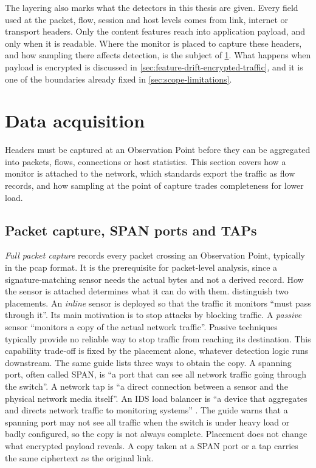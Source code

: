 The layering also marks what the detectors in this thesis are given. Every
field used at the packet, flow, session and host levels comes from link,
internet or transport headers. Only the content features reach into
application payload, and only when it is readable. Where the monitor is
placed to capture these headers, and how sampling there affects detection,
is the subject of \cref{sec:data-acquisition}. What happens when payload is
encrypted is discussed in \cref{sec:feature-drift-encrypted-traffic}, and it
is one of the boundaries already fixed in \cref{sec:scope-limitations}.

\section{Data acquisition}
\label{sec:data-acquisition}

Headers must be captured at an Observation Point before they can be
aggregated into packets, flows, connections or host statistics. This section
covers how a monitor is attached to the network, which standards export the
traffic as flow records, and how sampling at the point of capture trades
completeness for lower load.

\subsection{Packet capture, SPAN ports and TAPs}
\label{sec:packet-capture-mechanisms}

\emph{Full packet capture} records every packet crossing an Observation
Point, typically in the pcap format. It is the prerequisite for packet-level
analysis, since a signature-matching sensor needs the actual bytes and not a
derived record. How the sensor is attached determines what it can do with
them. \citet{scarfone2007nist80094} distinguish two placements. An
\emph{inline} sensor is deployed so that the traffic it monitors ``must pass
through it''. Its main motivation is to stop attacks by blocking traffic. A
\emph{passive} sensor ``monitors a copy of the actual network traffic''.
Passive techniques typically provide no reliable way to stop traffic from
reaching its destination. This capability trade-off is fixed by the
placement alone, whatever detection logic runs downstream. The same guide
lists three ways to obtain the copy. A spanning port, often called SPAN, is
``a port that can see all network traffic going through the switch''. A
network tap is ``a direct connection between a sensor and the physical
network media itself''. An IDS load balancer is ``a device that aggregates
and directs network traffic to monitoring systems''
\citep{scarfone2007nist80094}. The guide warns that a spanning port may not
see all traffic when the switch is under heavy load or badly configured, so
the copy is not always complete. Placement does not change what encrypted
payload reveals. A copy taken at a SPAN port or a tap carries the same
ciphertext as the original link.

